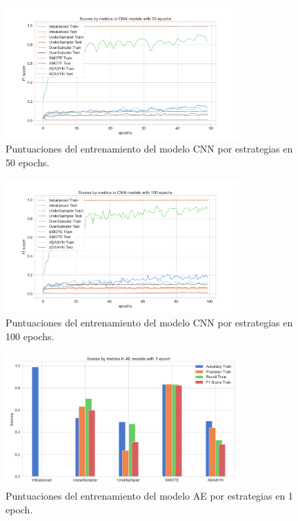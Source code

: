 \begin{figure}[h!]
	\centering
	\includegraphics[width=0.8\textwidth]{"figuras/Experimento5/CNN/CNN_50_train"}
	\caption{Puntuaciones del entrenamiento del modelo CNN por estrategias en 50 epochs.}
	\label{an:29}
\end{figure}

\begin{figure}[h!]
	\centering
	\includegraphics[width=0.8\textwidth]{"figuras/Experimento5/CNN/CNN_100_train"}
	\caption{Puntuaciones del entrenamiento del modelo CNN por estrategias en 100 epochs.}
	\label{an:30}
\end{figure}

\begin{figure}[h!]
	\centering
	\includegraphics[width=0.8\textwidth]{"figuras/Experimento5/AE/AE_1_train"}
	\caption{Puntuaciones del entrenamiento del modelo AE por estrategias en 1 epoch.}
	\label{an:31}
\end{figure}

